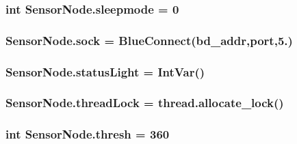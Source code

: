 \subsubsection[{\texorpdfstring{sleepmode}{sleepmode}}]{\setlength{\rightskip}{0pt plus 5cm}int Sensor\+Node.\+sleepmode = 0}\hypertarget{namespaceSensorNode_ae86281b81a8af8bc3b9f4bfe75af4748}{}\label{namespaceSensorNode_ae86281b81a8af8bc3b9f4bfe75af4748}
\subsubsection[{\texorpdfstring{sock}{sock}}]{\setlength{\rightskip}{0pt plus 5cm}Sensor\+Node.\+sock = Blue\+Connect({\bf bd\+\_\+addr},{\bf port},5.)}\hypertarget{namespaceSensorNode_a7a84ed25b4a6ec5b5008e9ebea3653dc}{}\label{namespaceSensorNode_a7a84ed25b4a6ec5b5008e9ebea3653dc}
\subsubsection[{\texorpdfstring{status\+Light}{statusLight}}]{\setlength{\rightskip}{0pt plus 5cm}Sensor\+Node.\+status\+Light = Int\+Var()}\hypertarget{namespaceSensorNode_a1b858f22f067073317637d8f686e7a51}{}\label{namespaceSensorNode_a1b858f22f067073317637d8f686e7a51}
\subsubsection[{\texorpdfstring{thread\+Lock}{threadLock}}]{\setlength{\rightskip}{0pt plus 5cm}Sensor\+Node.\+thread\+Lock = thread.\+allocate\+\_\+lock()}\hypertarget{namespaceSensorNode_af39573d5009a8cac514cfb9a933ca24a}{}\label{namespaceSensorNode_af39573d5009a8cac514cfb9a933ca24a}
\subsubsection[{\texorpdfstring{thresh}{thresh}}]{\setlength{\rightskip}{0pt plus 5cm}int Sensor\+Node.\+thresh = 360}\hypertarget{namespaceSensorNode_a3f20bf0e75b6bcd88e4cf67d89bec305}{}\label{namespaceSensorNode_a3f20bf0e75b6bcd88e4cf67d89bec305}
